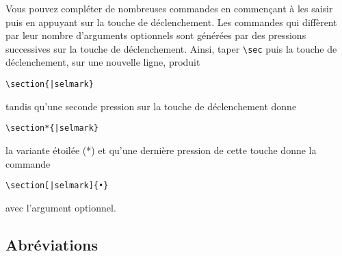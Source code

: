 \documentclass[11pt,french]{article}
\begin{document}
Vous pouvez compléter de nombreuses commandes en commençant à les saisir puis en appuyant sur la touche de déclenchement. Les commandes qui diffèrent par leur nombre d'arguments optionnels sont générées par des pressions successives sur la touche de déclenchement. Ainsi, taper \verb|\sec| puis la touche de déclenchement, sur une nouvelle ligne, produit
\begin{verbatim}
\section{|selmark}
\end{verbatim}
tandis qu'une seconde pression sur la touche de déclenchement donne 
\begin{verbatim}
\section*{|selmark}
\end{verbatim}
la variante étoilée (*) et qu'une dernière pression de cette touche donne la commande
\begin{verbatim}
\section[|selmark]{•}
\end{verbatim}
avec l'argument optionnel.

\subsection*{Abréviations}
\end{document}
